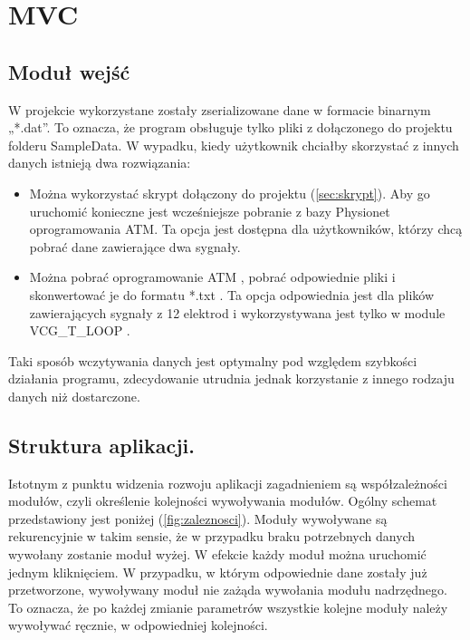 \section{MVC}
\subsection{Moduł wejść}
W projekcie wykorzystane zostały zserializowane dane w formacie binarnym „*.dat”. To oznacza, że program obsługuje tylko pliki z dołączonego do projektu folderu SampleData. W wypadku, kiedy użytkownik chciałby skorzystać z innych danych istnieją dwa rozwiązania:

\begin{itemize}
\item Można wykorzystać skrypt dołączony do projektu (\ref{sec:skrypt}). Aby go uruchomić konieczne jest wcześniejsze pobranie z bazy Physionet oprogramowania ATM.  Ta opcja jest dostępna dla użytkowników,  którzy  chcą pobrać dane zawierające dwa sygnały.
\item Można pobrać oprogramowanie ATM , pobrać odpowiednie pliki i skonwertować je do formatu *.txt . Ta opcja odpowiednia jest dla plików zawierających sygnały z 12 elektrod i wykorzystywana jest tylko w module VCG\_T\_LOOP .
\end{itemize}

Taki sposób wczytywania danych jest optymalny pod względem szybkości działania programu, zdecydowanie utrudnia jednak korzystanie z innego rodzaju danych niż dostarczone. 

\subsection{Struktura aplikacji.}
Istotnym z punktu widzenia rozwoju aplikacji zagadnieniem są współzależności modułów, czyli określenie kolejności wywoływania modułów. Ogólny schemat przedstawiony jest poniżej (\ref{fig:zaleznosci}). Moduły wywoływane są rekurencyjnie w takim sensie, że w przypadku braku potrzebnych danych wywołany zostanie moduł wyżej. W efekcie każdy moduł można uruchomić jednym kliknięciem. W przypadku, w którym odpowiednie dane zostały już przetworzone, wywoływany moduł nie zażąda wywołania modułu nadrzędnego. To oznacza, że po każdej zmianie parametrów wszystkie kolejne moduły należy wywoływać ręcznie, w odpowiedniej kolejności. 

